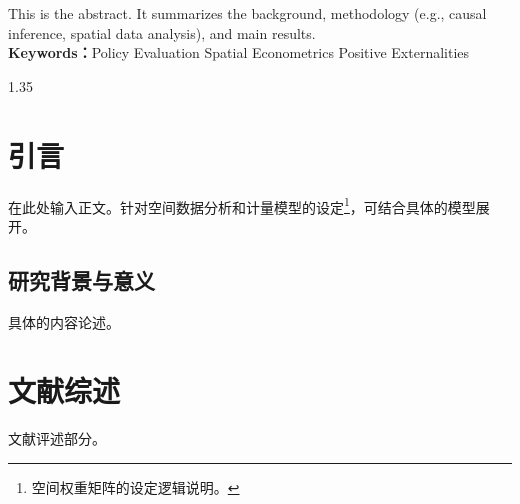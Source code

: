 \documentclass[12pt, UTF8]{ctexart}
\begin{document}


\newpage
\begin{abstract}
\begin{spacing}{1.5}
此处撰写中文摘要。重点阐述研究背景、因果推断方法、核心政策评估结果以及结论。
\\[12pt]
\textbf{\heiti 关键词：}政策评估 \quad 空间计量 \quad 正外部性
\end{spacing}
\end{abstract}

\setcounter{page}{1}
\cfoot{\footnotesize \thepage}
\newpage

\begin{enabstract}
\begin{doublespace}
This is the abstract. It summarizes the background, methodology (e.g., causal inference, spatial data analysis), and main results.
\\[12pt]
\textbf{Keywords：}Policy Evaluation \quad Spatial Econometrics \quad Positive Externalities
\end{doublespace}
\end{enabstract}
\cfoot{\thepage}
\newpage
\cfoot{}

\renewcommand\contentsname{内容目录}
\renewcommand\listfigurename{插\ 图}
\renewcommand\listtablename{表\ 格}

\tableofcontents
\listoffigures
\listoftables
\newpage

\setcounter{page}{1}
\pagestyle{fancy}

\begin{spacing}{1.35}

\section{引言}
在此处输入正文。针对空间数据分析和计量模型的设定\footnote{空间权重矩阵的设定逻辑说明。}，可结合具体的模型展开。

\subsection{研究背景与意义}
具体的内容论述。

\section{文献综述}
文献评述部分。

\end{spacing}
\end{document}
